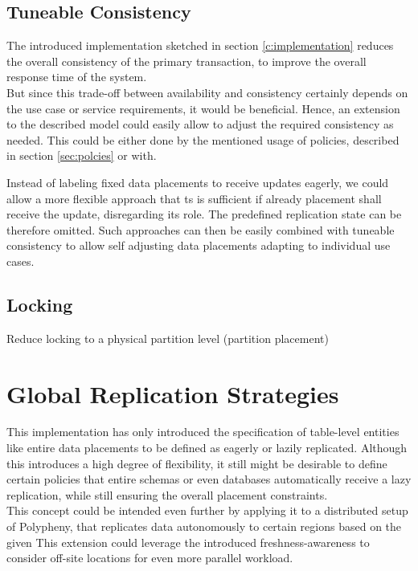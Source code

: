 \subsection{Tuneable Consistency}
The introduced implementation sketched in section \ref{c:implementation} reduces the overall consistency of the primary transaction,
to improve the overall response time of the system.\\ 
But since this trade-off between availability and consistency certainly depends on the use case or service requirements, it would be beneficial.
Hence, an extension to the described model could easily allow to adjust the required consistency as needed. 
This could be either done by the mentioned usage of policies, described in section \ref{sec:polcies} or with.

Instead of labeling fixed data placements to receive updates eagerly, we could allow a more flexible approach that ts is sufficient if already placement 
shall receive the update, disregarding its role. The predefined replication state can be therefore omitted. 
Such approaches can then be easily combined with tuneable consistency to allow self adjusting data placements  adapting to individual use cases.

\subsection{Locking}
Reduce locking to a physical partition level  (partition placement)





\tocless\section{Global Replication Strategies}
This implementation has only introduced the specification of table-level entities like entire data placements to be defined as eagerly or lazily replicated.
Although this introduces a high degree of flexibility, it still might be desirable to define certain policies that entire schemas or even databases automatically 
receive a lazy replication, while still ensuring the overall placement constraints.\\
This concept could be intended even further by applying it to a distributed setup of Polypheny, that replicates data autonomously to certain regions based on the given 
This extension could leverage the introduced freshness-awareness to consider off-site locations for even more parallel workload.


